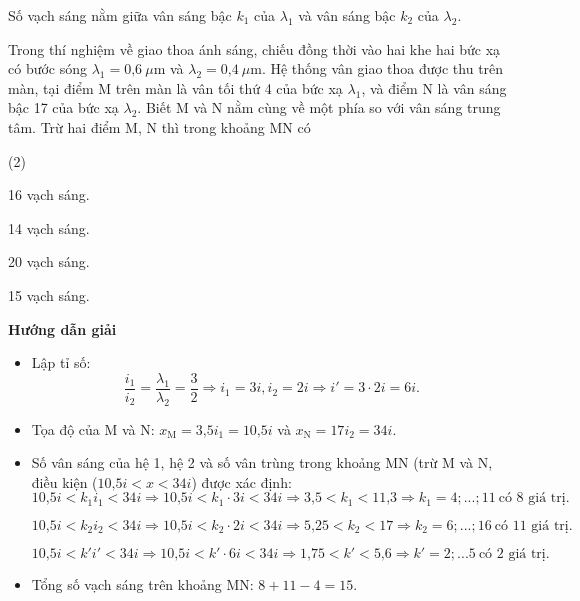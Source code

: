 \begin{dang}{Số vạch sáng nằm giữa vân sáng bậc $k_1$ của $\lambda_1$ và vân sáng bậc $k_2$ của $\lambda_2$.}
{
Trong thí nghiệm về giao thoa ánh sáng, chiếu đồng thời vào hai khe hai bức xạ có bước sóng $\lambda_1 = \text{0,6}\ \mu \text{m}$ và $\lambda_2 = \text{0,4}\ \mu \text{m}$. Hệ thống vân giao thoa được thu trên màn, tại điểm M trên màn là vân tối thứ 4 của bức xạ $\lambda_1$, và điểm N là vân sáng bậc 17 của bức xạ $\lambda_2$. Biết M và N nằm cùng về một phía so với vân sáng trung tâm. Trừ hai điểm M, N thì trong khoảng MN có
\begin{mcq}(2)
\item 16 vạch sáng. 	
\item 14 vạch sáng.   	
\item 20 vạch sáng. 	   
\item 15 vạch sáng.
\end{mcq}
}
{\begin{center}
	\textbf{Hướng dẫn giải}
\end{center}

\begin{itemize}
	\item Lập tỉ số: 
	\begin{equation*}
		\dfrac{i_1}{i_2}=\dfrac{\lambda_1}{\lambda_2}=\dfrac{3}{2} \Rightarrow i_1=3i, i_2=2i \Rightarrow i'=3\cdot 2i=6i.
	\end{equation*}
	\item Tọa độ của M và N: $x_{\text{M}}=\text{3,5}i_1=\text{10,5}i$ và $x_{\text{N}}=17i_2=34i$.
	\item Số vân sáng của hệ 1, hệ 2 và số vân trùng trong khoảng MN (trừ M và N, điều kiện ($\text{10,5}i < x < 34i$) được xác định: 
	\begin{equation*}
		\text{10,5}i < k_1i_1  < 34i \Rightarrow \text{10,5}i<k_1\cdot 3i<34i \Rightarrow \text{3,5}<k_1< \text{11,3} \Rightarrow k_1=4;...;11\ \text {có 8 giá trị}.
	\end{equation*}
	
	\begin{equation*}
		\text{10,5}i < k_2i_2  < 34i \Rightarrow \text{10,5}i<k_2\cdot 2i<34i \Rightarrow \text{5,25}<k_2< 17 \Rightarrow k_2=6;...;16\ \text {có 11 giá trị}.
	\end{equation*}
	
	\begin{equation*}
		\text{10,5}i < k'i'  < 34i \Rightarrow \text{10,5}i<k'\cdot 6i<34i \Rightarrow \text{1,75}<k'< \text{5,6} \Rightarrow k'=2;...5\ \text {có 2 giá trị}.
	\end{equation*}
	
	\item Tổng số vạch sáng trên khoảng MN: $8+11-4=15$.  
\end{itemize}

}
\end{dang}
